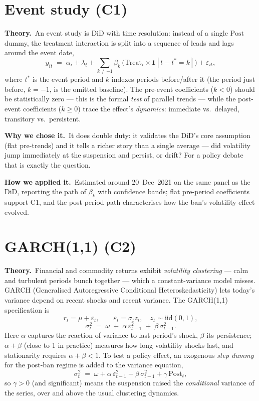 \documentclass[11pt]{article}
\newcommand{\why}{\smallskip\noindent\textbf{Why we chose it.}\ }
\newcommand{\how}{\smallskip\noindent\textbf{How we applied it.}\ }
\newcommand{\thy}{\noindent\textbf{Theory.}\ }
\begin{document}
\section{Event study (C1)}
\thy An event study is DiD with time resolution: instead of a single $\mathrm{Post}$ dummy,
the treatment interaction is split into a sequence of leads and lags around the event date,
\[
  y_{it} \;=\; \alpha_i + \lambda_t + \sum_{k\neq -1}\beta_k\,\big(\mathrm{Treat}_i \times \mathbf{1}[t-t^\ast=k]\big) + \varepsilon_{it},
\]
where $t^\ast$ is the event period and $k$ indexes periods before/after it (the period just
before, $k=-1$, is the omitted baseline). The pre-event coefficients ($k<0$) should be
statistically zero --- this is the formal \emph{test} of parallel trends --- while the
post-event coefficients ($k\ge 0$) trace the effect's \emph{dynamics}: immediate vs.\
delayed, transitory vs.\ persistent.

\why It does double duty: it validates the DiD's core assumption (flat pre-trends) and it
tells a richer story than a single average --- did volatility jump immediately at the
suspension and persist, or drift? For a policy debate that is exactly the question.

\how Estimated around 20~Dec~2021 on the same panel as the DiD, reporting the path of
$\beta_k$ with confidence bands; flat pre-period coefficients support C1, and the post-period
path characterises how the ban's volatility effect evolved.

\section{GARCH(1,1) (C2)}
\thy Financial and commodity returns exhibit \emph{volatility clustering} --- calm and
turbulent periods bunch together --- which a constant-variance model misses. GARCH
(Generalised Autoregressive Conditional Heteroskedasticity) lets today's variance depend on
recent shocks and recent variance. The GARCH(1,1) specification is
\[
  r_t = \mu + \varepsilon_t,\qquad \varepsilon_t = \sigma_t z_t,\quad z_t \sim \text{iid}(0,1),
\]
\[
  \sigma_t^2 \;=\; \omega \;+\; \alpha\,\varepsilon_{t-1}^2 \;+\; \beta\,\sigma_{t-1}^2 .
\]
Here $\alpha$ captures the reaction of variance to last period's shock, $\beta$ its
persistence; $\alpha+\beta$ (close to 1 in practice) measures how long volatility shocks
last, and stationarity requires $\alpha+\beta<1$. To test a policy effect, an exogenous
\emph{step dummy} for the post-ban regime is added to the variance equation,
\[
  \sigma_t^2 \;=\; \omega + \alpha\,\varepsilon_{t-1}^2 + \beta\,\sigma_{t-1}^2 + \gamma\,\mathrm{Post}_t,
\]
so $\gamma>0$ (and significant) means the suspension raised the \emph{conditional} variance
of the series, over and above the usual clustering dynamics.
\end{document}
